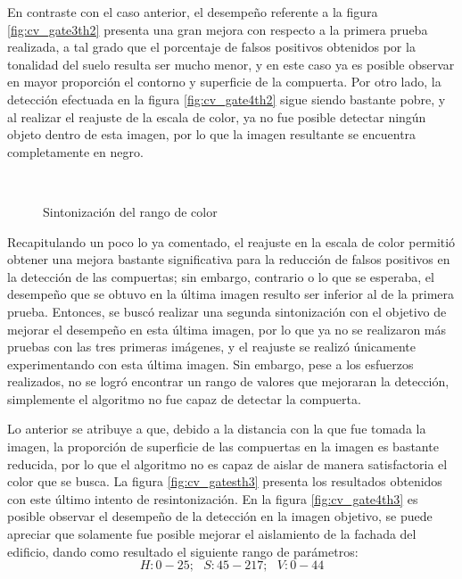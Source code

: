 En contraste con el caso anterior, el desempeño referente a la figura \ref{fig:cv_gate3th2} presenta una gran mejora con respecto a la primera prueba realizada, a tal grado que el porcentaje de falsos positivos obtenidos por la tonalidad del suelo resulta ser mucho menor, y en este caso ya es posible observar en mayor proporción el contorno y superficie de la compuerta. Por otro lado, la detección efectuada en la figura \ref{fig:cv_gate4th2} sigue siendo bastante pobre, y al realizar el reajuste de la escala de color, ya no fue posible detectar ningún objeto dentro de esta imagen, por lo que la imagen resultante se encuentra completamente en negro.


\begin{figure}[ht]
    \centering
    \hfill
    \\
    \hfill
    \hfill

    \caption{Sintonización del rango de color}
    \label{fig:cv_gatesth2}
\end{figure}

Recapitulando un poco lo ya comentado, el reajuste en la escala de color permitió obtener una mejora bastante significativa para la reducción de falsos positivos en la detección de las compuertas; sin embargo, contrario o lo que se esperaba, el desempeño que se obtuvo en la última imagen resulto ser inferior al de la primera prueba. Entonces, se buscó realizar una segunda sintonización con el objetivo de mejorar el desempeño en esta última imagen, por lo que ya no se realizaron más pruebas con las tres primeras imágenes, y el reajuste se realizó únicamente experimentando con esta última imagen. Sin embargo, pese a los esfuerzos realizados, no se logró encontrar un rango de valores que mejoraran la detección, simplemente el algoritmo no fue capaz de detectar la compuerta.

Lo anterior se atribuye a que, debido a la distancia con la que fue tomada la imagen, la proporción de superficie de las compuertas en la imagen es bastante reducida, por lo que el algoritmo no es capaz de aislar de manera satisfactoria el color que se busca. La figura \ref{fig:cv_gatesth3} presenta los resultados obtenidos con este último intento de resintonización. En la figura \ref{fig:cv_gate4th3} es posible observar el desempeño de la detección en la imagen objetivo, se puede apreciar que solamente fue posible mejorar el aislamiento de la fachada del edificio, dando como resultado el siguiente rango de parámetros:\[H:0-25;\text{ } S:45-217;\text{ } V:0-44\]

